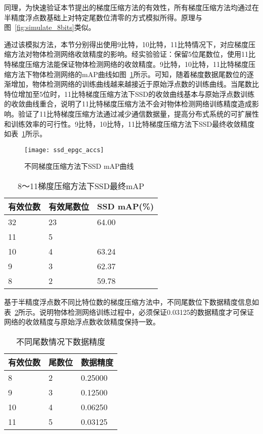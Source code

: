 同理，为快速验证本节提出的梯度压缩方法的有效性，所有梯度压缩方法均通过在半精度浮点数基础上对特定尾数位清零的方式模拟所得。原理与图~\ref{fig:simulate_8bits}类似。

通过该模拟方法，本节分别得出使用9比特，10比特，11比特情况下，对应梯度压缩方法对物体检测网络收敛精度的影响。经实验验证：保留5位尾数位，使用11比特梯度压缩方法能保证物体检测网络的收敛精度。9比特，10比特，11比特梯度压缩方法下物体检测网络的mAP曲线如图~\ref{fig:ssd_epgc_accs}所示。可知，随着梯度数据尾数位的逐渐增加，物体检测网络的训练曲线越来越接近于原始浮点数的训练曲线。当尾数比特位增加至5位时，11比特梯度压缩方法下SSD的收敛曲线基本与原始浮点数训练的收敛曲线重合，说明了11比特梯度压缩方法不会对物体检测网络训练精度造成影响。验证了11比特梯度压缩方法通过减少通信数据量，提高分布式系统的可扩展性和训练效率的可行性。9比特，10比特，11比特梯度压缩方法下SSD最终收敛精度如表~\ref{tab:ssd_epdc_final_accs}所示。

\begin{figure}[htp]
\centering
\texttt{[image: ssd\_epgc\_accs]}
\caption{不同梯度压缩方法下SSD mAP曲线}
\label{fig:ssd_epgc_accs}
\end{figure}

\begin{table}[htb]
\centering
\noindent\begin{minipage}{0.6\textwidth}
\centering
\caption{8～11梯度压缩方法下SSD最终mAP}
\label{tab:ssd_epdc_final_accs}
\begin{tabular}{p{2cm}p{2cm}p{2.5cm}}
\toprule[1.5pt]
有效位数 & 有效尾数位 & SSD mAP(\%) \\\midrule[1pt]
32 & 23 & 64.00 \\
11 & 5 &  \\
10 & 4 & 63.24 \\
9 & 3 & 62.37 \\
8 & 2 & 59.78 \\
\midrule[1pt]
\end{tabular}
\end{minipage}
\end{table}

基于半精度浮点数不同比特位数的梯度压缩方法中，不同尾数位下数据精度信息如表~\ref{tab:ssd_epdc_precisions}所示。说明物体检测网络训练过程中，必须保证0.03125的数据精度才可保证网络的收敛精度与原始浮点数收敛精度保持一致。

\begin{table}[htb]
\centering
\noindent\begin{minipage}{0.5\textwidth}
\centering
\caption{不同尾数情况下数据精度}
\label{tab:ssd_epdc_precisions}
\begin{tabular}{p{2cm}p{2cm}p{2cm}}
\toprule[1.5pt]
有效位数 & 尾数位 & 数据精度 \\\midrule[1pt]
8 & 2 & 0.25000 \\
9 & 3 & 0.12500 \\
10 & 4 & 0.06250 \\
11 & 5 & 0.03125 \\
\midrule[1pt]
\end{tabular}
\end{minipage}
\end{table}

